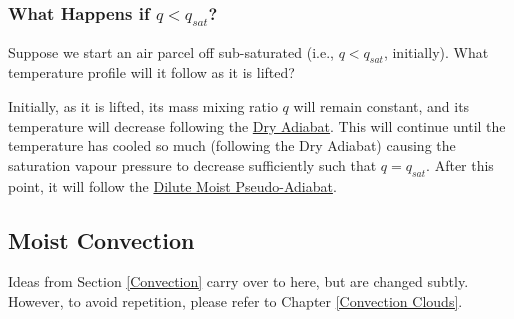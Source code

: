 \subsubsection{What Happens if $q<q_{sat}$?}

Suppose we start an air parcel off sub-saturated (i.e., $q<q_{sat}$, initially). What temperature profile will it follow as it is lifted? 

Initially, as it is lifted, its mass mixing ratio $q$ will remain constant, and its temperature will decrease following the \hyperref[Dry Adiabat]{Dry Adiabat}. This will continue until the temperature has cooled so much (following the Dry Adiabat) causing the saturation vapour pressure to decrease sufficiently such that $q=q_{sat}$. After this point, it will follow the \hyperref[dilute moist adiabat]{Dilute Moist Pseudo-Adiabat}.

\subsection{Moist Convection}

Ideas from Section \ref{Convection} carry over to here, but are changed subtly. However, to avoid repetition, please refer to Chapter \ref{Convection Clouds}.